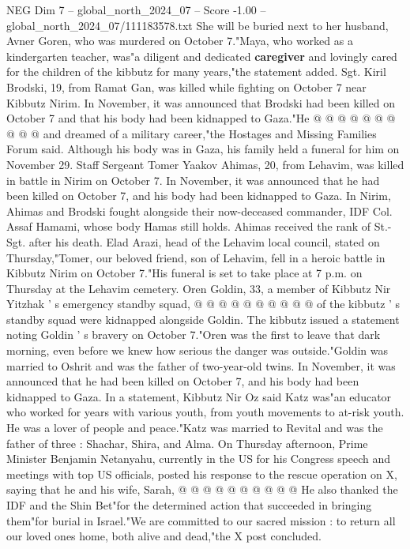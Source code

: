 \begin{textsample}{NEG Dim 7 – global\_north\_2024\_07 – Score -1.00 – global\_north\_2024\_07/111183578.txt}
She will be buried next to her husband, Avner Goren, who was murdered on October 7."Maya, who worked as a kindergarten teacher, was"a diligent and dedicated \textbf{caregiver} and lovingly cared for the children of the kibbutz for many years,"the statement added.
Sgt.
Kiril Brodski, 19, from Ramat Gan, was killed while fighting on October 7 near Kibbutz Nirim.
In November, it was announced that Brodski had been killed on October 7 and that his body had been kidnapped to Gaza."He @ @ @ @ @ @ @ @ @ @ and dreamed of a military career,"the Hostages and Missing Families Forum said.
Although his body was in Gaza, his family held a funeral for him on November 29.
Staff Sergeant Tomer Yaakov Ahimas, 20, from Lehavim, was killed in battle in Nirim on October 7.
In November, it was announced that he had been killed on October 7, and his body had been kidnapped to Gaza.
In Nirim, Ahimas and Brodski fought alongside their now-deceased commander, IDF Col.
Assaf Hamami, whose body Hamas still holds.
Ahimas received the rank of St.-Sgt. after his death.
Elad Arazi, head of the Lehavim local council, stated on Thursday,"Tomer, our beloved friend, son of Lehavim, fell in a heroic battle in Kibbutz Nirim on October 7."His funeral is set to take place at 7 p.m. on Thursday at the Lehavim cemetery.
Oren Goldin, 33, a member of Kibbutz Nir Yitzhak ' s emergency standby squad, @ @ @ @ @ @ @ @ @ @ of the kibbutz ' s standby squad were kidnapped alongside Goldin.
The kibbutz issued a statement noting Goldin ' s bravery on October 7."Oren was the first to leave that dark morning, even before we knew how serious the danger was outside."Goldin was married to Oshrit and was the father of two-year-old twins.
In November, it was announced that he had been killed on October 7, and his body had been kidnapped to Gaza.
In a statement, Kibbutz Nir Oz said Katz was"an educator who worked for years with various youth, from youth movements to at-risk youth.
He was a lover of people and peace."Katz was married to Revital and was the father of three : Shachar, Shira, and Alma.
On Thursday afternoon, Prime Minister Benjamin Netanyahu, currently in the US for his Congress speech and meetings with top US officials, posted his response to the rescue operation on X, saying that he and his wife, Sarah, @ @ @ @ @ @ @ @ @ @ He also thanked the IDF and the Shin Bet"for the determined action that succeeded in bringing them"for burial in Israel."We are committed to our sacred mission : to return all our loved ones home, both alive and dead,"the X post concluded.

\end{textsample}
